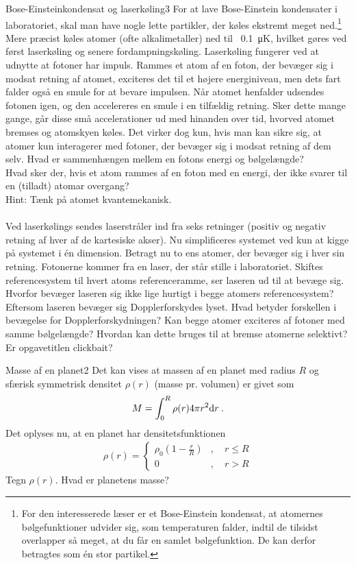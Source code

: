 \begin{opgave}{Bose-Einsteinkondensat og laserkøling}{3}
For at lave Bose-Einstein kondensater i laboratoriet, skal man have nogle lette partikler, der køles ekstremt meget ned.\footnote{For den interesserede læser er et Bose-Einstein kondensat, at atomernes bølgefunktioner udvider sig, som temperaturen falder, indtil de tilsidst overlapper så meget, at du får en samlet bølgefunktion. De kan derfor betragtes som én stor partikel.} Mere præcist køles atomer (ofte alkalimetaller) ned til ~\SI{.1}{\micro\kelvin}, hvilket gøres ved først laserkøling og senere fordampningskøling. Laserkøling fungerer ved at udnytte at fotoner har impuls. Rammes et atom af en foton, der bevæger sig i modsat retning af atomet, exciteres det til et højere energiniveau, men dets fart falder også en smule for at bevare impulsen. Når atomet henfalder udsendes fotonen igen, og den accelereres en smule i en tilfældig retning. Sker dette mange gange, går disse små accelerationer ud med hinanden over tid, hvorved atomet bremses og atomskyen køles. Det virker dog kun, hvis man kan sikre sig, at atomer kun interagerer med fotoner, der bevæger sig i modsat retning af dem selv.
\opg Hvad er sammenhængen mellem en fotons energi og bølgelængde? \\
\opg Hvad sker der, hvis et atom rammes af en foton med en energi, der ikke svarer til en (tilladt) atomar overgang?\\ Hint: Tænk på atomet kvantemekanisk.\\ \\
Ved laserkølings sendes laserstråler ind fra seks retninger (positiv og negativ retning af hver af de kartesiske akser). Nu simplificeres systemet ved kun at kigge på systemet i én dimension. Betragt nu to ens atomer, der bevæger sig i hver sin retning. Fotonerne kommer fra en laser, der står stille i laboratoriet.
\opg Skiftes referencesystem til hvert atoms referenceramme, ser laseren ud til at bevæge sig. Hvorfor bevæger laseren sig ikke lige hurtigt i begge atomers referencesystem?
\opg Eftersom laseren bevæger sig Dopplerforskydes lyset. Hvad betyder forskellen i bevægelse for Dopplerforskydningen?
\opg Kan begge atomer exciteres af fotoner med samme bølgelængde?
\opg Hvordan kan dette bruges til at bremse atomerne selektivt?
\opg Er opgavetitlen clickbait?
\end{opgave}
%
%
\begin{opgave}{Masse af en planet}{2} \label{opg:MassePlanet}
Det kan vises at massen af en planet med radius $R$ og sfærisk symmetrisk densitet $\rho(r)$ (masse pr. volumen) er givet som
\begin{align} \label{eq:PlanetMasse}
    M = \int_0^R\rho(r)4\pi r^2\mathrm{d} r \: .
\end{align}
Det oplyses nu, at en planet har densitetsfunktionen
\begin{align*}
    \rho(r) = \begin{cases}
                \rho_0\left(1 - \frac{r}{R}\right)&, \quad r\leq R \\
                0 &, \quad r>R
                \end{cases}
\end{align*}
\opg Tegn $\rho(r)$.
\opg Hvad er planetens masse?
\end{opgave}
